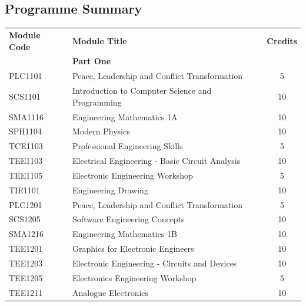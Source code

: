 \subsection*{Programme Summary}
\vspace{0ex}%
\noindent\begin{tcolorbox}[breakable, width=0.5\textwidth, align=left, enhanced, left= -3pt, boxrule=0pt, colback=white, colframe=white, before=\noindent, top=-13pt, bottom=-8pt]
             \noindent\begin{longtable}{@{}llS[table-format = 4.3]}
                          \textsf{\textbf{Module Code}} & \textsf{\textbf{Module Title}} & \textsf{\textbf{Credits}} \\
                          & \textbf{Part One} & \\
                          PLC1101 & Peace, Leadership and Conflict Transformation   & 5  \\
                          SCS1101 & Introduction to Computer Science and Programming & 10 \\
                          SMA1116 & Engineering Mathematics 1A & 10 \\
                          SPH1104 & Modern Physics  & 10 \\
                          TCE1103 & Professional Engineering Skills  & 5 \\
                          TEE1103 & Electrical Engineering - Basic Circuit Analysis & 10\\
                          TEE1105 & Electronic Engineering Workshop & 5 \\
                          TIE1101 & Engineering Drawing  & 10 \\
                          PLC1201 & Peace, Leadership and Conflict Transformation  & 5\\
                          SCS1205 & Software Engineering Concepts & 10 \\
                          SMA1216 & Engineering Mathematics 1B & 10 \\
                          TEE1201 & Graphics for Electronic Engineers & 10 \\
                          TEE1203 & Electronic Engineering - Circuits and Devices & 10 \\
                          TEE1205 & Electronics Engineering Workshop & 5\\
                          TEE1211 & Analogue Electronics & 10 \\

\end{longtable}
\end{tcolorbox}
